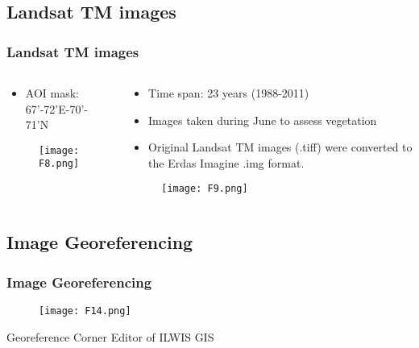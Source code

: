 \documentclass[pdflatex,compress,9pt,
	xcolor={dvipsnames,dvipsnames,svgnames,x11names,table},
	hyperref={colorlinks = true,breaklinks = true, urlcolor = NavyBlue, breaklinks = true}]{beamer}
\begin{document}
\subsection{Landsat TM images}
\begin{frame}\frametitle{Landsat TM images}
\begin{minipage}[0.4\textheight]{\textwidth}
\begin{columns}[T]
\begin{column}{0.5\textwidth}
\begin{itemize}
            \item AOI mask: 67'-72'E-70'- 71'N 
\end{itemize}
\begin{figure}[H]
	\centering
		\texttt{[image: F8.png]}
\end{figure}
\end{column}
\begin{column}{0.5\textwidth}
\begin{itemize}
            \item Time span: 23 years (1988-2011)
            \item Images taken during June to assess vegetation
            \item Original Landsat TM images (.tiff) were converted to the Erdas Imagine .img format.
\end{itemize}
\begin{figure}[H]
	\centering
		\texttt{[image: F9.png]}
\end{figure}
\end{column}
\end{columns}
\end{minipage}
\end{frame}

\subsection{Image Georeferencing}
\begin{frame}\frametitle{Image Georeferencing}
\begin{figure}[H]
	\centering
		\texttt{[image: F14.png]}
\end{figure}
Georeference Corner Editor of ILWIS GIS
\end{frame}
\end{document}
